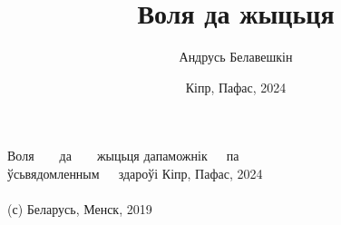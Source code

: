 \documentclass[letterpaper,10pt,openany,twocolumn]{memoir}
\author{Андрусь Белавешкін}
\title{Воля да жыцьця}
\date{Кіпр, Пафас, 2024}
\begin{document}
%

\begin{titlingpage}
      {Воля~~~~да~~~~жыцьця}
      {дапаможнік~~~па\\ўсьвядомленным~~~здароўі}
      {Кіпр, Пафас, 2024 \\~\\ (с) Беларусь, Менск, 2019}

\end{titlingpage}

\pagestyle{headings}
\setcounter{page}{3}
\setcounter{tocdepth}{1}
\tableofcontents*
\clearpage

















\end{document}
